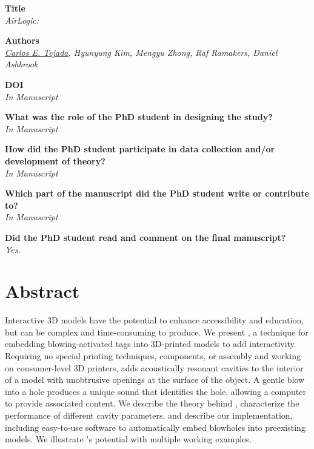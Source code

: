   \vfill

  \noindent
  \textbf{Title}\\
  \textit{AirLogic: }

  \bigskip

  \noindent
  \textbf{Authors}\\
  \textit{\underline{Carlos E. Tejada}, Hyunyung Kim, Mengyu Zhong, Raf Ramakers, Daniel Ashbrook}

  \bigskip

  \noindent
  \textbf{DOI}\\
  \textit{In Manuscript}

  \bigskip

  \noindent
  \textbf{What was the role of the PhD student in designing the study?}\\
  \textit{In Manuscript}

  \bigskip

  \noindent
  \textbf{How did the PhD student participate in data collection and/or development of theory?}\\
  \textit{In Manuscript}

  \bigskip

  \noindent
  \textbf{Which part of the manuscript did the PhD student write or contribute to?}\\
  \textit{In Manuscript}

  \bigskip

  \noindent
  \textbf{Did the PhD student read and comment on the final manuscript?}\\
  \textit{Yes.}

  \bigskip
  \vfill

  \newpage

  \section{Abstract}
    Interactive 3D models have the potential to enhance accessibility and
    education, but can be complex and time-consuming to produce. We present
    \textit{\bh}, a technique for embedding blowing-activated tags into
    3D-printed models to add interactivity. Requiring no special printing
    techniques, components, or assembly and working on consumer-level 3D
    printers, \bh adds acoustically resonant cavities to the interior of a model
    with unobtrusive openings at the surface of the object. A gentle blow into a
    hole produces a unique sound that identifies the hole, allowing a computer
    to provide associated content. We describe the theory behind \bh,
    characterize the performance of different cavity parameters, and describe
    our implementation, including easy-to-use software to automatically embed
    blowholes into preexisting models. We illustrate \bh's potential with
    multiple working examples. 
  
